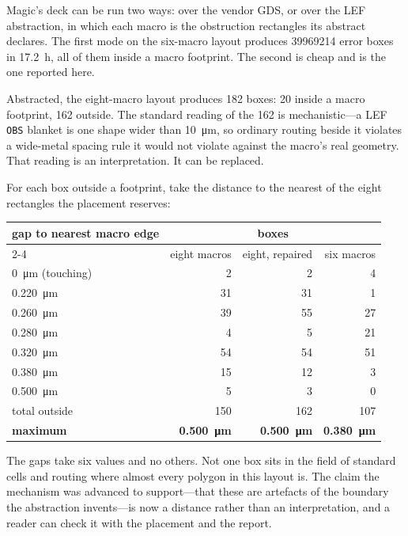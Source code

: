 \documentclass[11pt,a4paper]{article}
\begin{document}
Magic's deck can be run two ways: over the vendor GDS, or over the LEF
abstraction, in which each macro is the obstruction rectangles its
abstract declares. The first mode on the six-macro layout produces
\num{39969214} error boxes in \SI{17.2}{\hour}, all of them inside a macro
footprint. The second is cheap and is the one reported here.

Abstracted, the eight-macro layout produces \num{182} boxes: \num{20}
inside a macro footprint, \num{162} outside. The standard reading of the
\num{162} is mechanistic---a LEF \texttt{OBS} blanket is one shape wider
than \SI{10}{\um}, so ordinary routing beside it violates a
wide-metal spacing rule it would not violate against the macro's real
geometry. That reading is an interpretation. It can be replaced.

For each box outside a footprint, take the distance to the nearest of the
eight rectangles the placement reserves:

\begin{center}
\begin{tabular}{lrrr}
\toprule
gap to nearest macro edge & \multicolumn{3}{c}{boxes} \\
\cmidrule(l){2-4}
 & eight macros & eight, repaired & six macros \\
\midrule
\SI{0}{\um} (touching) & 2  & 2  & 4  \\
\SI{0.220}{\um}        & 31 & 31 & 1  \\
\SI{0.260}{\um}        & 39 & 55 & 27 \\
\SI{0.280}{\um}        & 4  & 5  & 21 \\
\SI{0.320}{\um}        & 54 & 54 & 51 \\
\SI{0.380}{\um}        & 15 & 12 & 3  \\
\SI{0.500}{\um}        & 5  & 3  & 0  \\
\midrule
total outside                   & \num{150} & \num{162} & \num{107} \\
\textbf{maximum}                & \textbf{\SI{0.500}{\um}}
                                & \textbf{\SI{0.500}{\um}}
                                & \textbf{\SI{0.380}{\um}} \\
\bottomrule
\end{tabular}
\end{center}

The gaps take six values and no others. Not one box sits in the field of
standard cells and routing where almost every polygon in this layout is.
The claim the mechanism was advanced to support---that these are
artefacts of the boundary the abstraction invents---is now a distance
rather than an interpretation, and a reader can check it with the
placement and the report.
\end{document}
